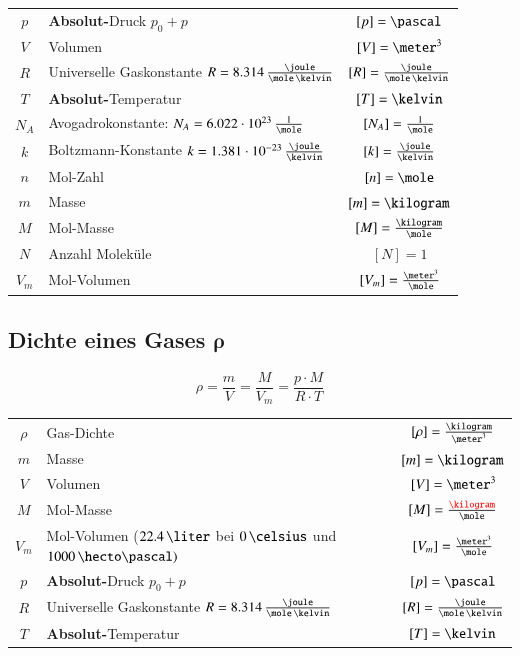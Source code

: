 \renewcommand{\arraystretch}{1.3}
\begin{tabular}{c l c}
	$p$ 	& \textbf{Absolut-}Druck $p_0 + p$ 											& $[p] = \pascal$ 							\\
	$V$ 	& Volumen 																	& $[V] = \meter^3$ 							\\
	$R$		& Universelle Gaskonstante $R = 8.314 \, \frac{\joule}{\mole \, \kelvin}$ 	& $[R] = \frac{\joule}{\mole \, \kelvin}$ 	\\
	$T$ 	& \textbf{Absolut-}Temperatur 												& $[T] = \kelvin$ 							\\
	$N_A$	& Avogadrokonstante: $N_A = 6.022 \cdot 10^{23} \, \frac{1}{\mole}$ 		& $[N_A] = \frac{1}{\mole}$					\\	
	$k$		& Boltzmann-Konstante $k = 1.381 \cdot 10^{-23} \, \frac{\joule}{\kelvin}$ 	& $[k] = \frac{\joule}{\kelvin}$			\\
	$n$ 	& Mol-Zahl 																	& $[n] = \mole$ 							\\
	$m$ 	& Masse 																	& $[m] = \kilogram$ 						\\
	$M$ 	& Mol-Masse 																& $[M] = \frac{\kilogram}{\mole}$			\\
	$N$ 	& Anzahl Moleküle 															& $[N] = 1$ 								\\
	$V_m$ 	& Mol-Volumen 																& $[V_m] = \frac{\meter^3}{\mole}$
\end{tabular}
\renewcommand{\arraystretch}{1}


\subsection[Dichte eines Gases]{Dichte eines Gases $\bm{\rho}$}

\vspace{-0.2cm}

$$ \boxed{ \rho = \frac{m}{V} = \frac{M}{V_m} = \frac{p \cdot M}{R \cdot T} }$$

\renewcommand{\arraystretch}{1.3}
\begin{tabular}{c l c}
	$\rho$ 	& Gas-Dichte 																		& $[\rho] = \frac{\kilogram}{\meter^3}$		\\
	$m$ 	& Masse 																			& $[m] = \kilogram$ 						\\
	$V$ 	& Volumen 																			& $[V] = \meter^3$ 							\\
	$M$ 	& Mol-Masse 																		& $[M] = \frac{\color{red}\kilogram}{\mole}$			\\
	$V_m$ 	& Mol-Volumen ($22.4 \, \liter$ bei $0 \, \celsius$ und $1000 \, \hecto \pascal)$	& $[V_m] = \frac{\meter^3}{\mole}$ 			\\
	$p$ 	& \textbf{Absolut-}Druck $p_0 + p$ 													& $[p] = \pascal$ 							\\
	$R$		& Universelle Gaskonstante $R = 8.314 \, \frac{\joule}{\mole \, \kelvin}$ 			& $[R] = \frac{\joule}{\mole \, \kelvin}$ 	\\
	$T$ 	& \textbf{Absolut-}Temperatur 														& $[T] = \kelvin$
\end{tabular}
\renewcommand{\arraystretch}{1}


